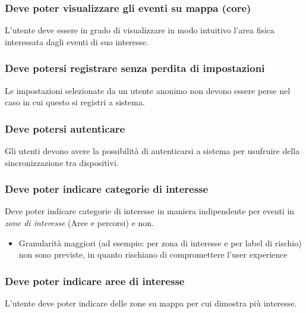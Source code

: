 \documentclass{article}
\begin{document}
\subsubsection{Deve poter visualizzare gli eventi su mappa (core)}
\label{5.1.4}
L'utente deve essere in grado di visualizzare in modo intuitivo l'area fisica interessata dagli eventi di suo interesse. 

\subsubsection{Deve potersi registrare senza perdita di impostazioni}
\label{5.1.5}
Le impostazioni selezionate da un utente anonimo non devono essere perse nel caso in cui questo si registri a sistema.

\subsubsection{Deve potersi autenticare}
\label{5.1.6}
Gli utenti devono avere la possibilità di autenticarsi a sistema per usufruire della sincronizzazione tra dispositivi.

\subsubsection{Deve poter indicare categorie di interesse}
\label{5.1.7}
Deve poter indicare categorie di interesse in maniera indipendente per eventi in \textit{zone di interesse} (Aree e percorsi) e non.
\begin{itemize}
    \item Granularità maggiori (ad esempio: per zona di interesse e per label di rischio) non sono previste, in quanto rischiano di compromettere l'user experience
\end{itemize}

\subsubsection{Deve poter indicare aree di interesse}
\label{5.1.8}
L'utente deve poter indicare delle zone su mappa per cui dimostra più interesse.
\end{document}
